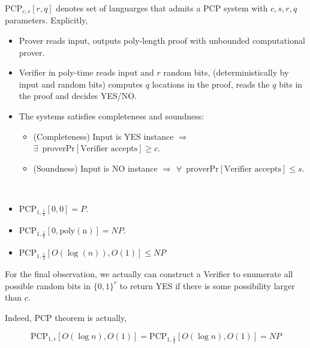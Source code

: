 
\begin{definition}
    $ \mathrm{PCP}_{c,s}[r,q] $ denotes set of languarges that admits a PCP system with  $ c,s,r,q  $ parameters. Explicitly,
    \begin{itemize}
        \item Prover reads input, outputs poly-length proof with unbounded computational prover.
        \item Verifier in poly-time reads input and  $ r $ random bits, (deterministically by input and random bits) computes  $ q $ locations in the proof, reads the  $ q $ bits in the proof and decides YES/NO.
        \item The systems satisfies  completeness and soundness:
        \begin{itemize}
            \item (Completeness) Input is YES instance  $ \Rightarrow  $  $ \exists\,\text{ prover}\mathrm{Pr}[\text{Verifier accepts}] \geq c $.
            \item (Soundness) Input is NO instance  $ \Rightarrow  $  $ \forall\,\text{ prover}\mathrm{Pr}[\text{Verifier accepts}] \leq s $. 
        \end{itemize}
    \end{itemize}
\end{definition}
\begin{observation}
    \,
    \begin{itemize}
        \item  $ \mathrm{PCP}_{1,\frac{1}{2}}[0,0]=P $.
        \item  $ \mathrm{PCP}_{1,\frac{1}{2}}[0,\mathrm{poly(n)}]=NP $.
        \item  $ \mathrm{PCP}_{1,\frac{1}{2}}[O(\log(n)),O(1)] \leq NP $   
    \end{itemize}
\end{observation}
For the final observation, we actually can construct a Verifier to enumerate all possible random bits in $ \{0,1\}^r $ to return YES if there is some possibility larger than  $ c $.

Indeed, PCP theorem is actually,
\begin{theorem}
    \[\mathrm{PCP}_{1,\epsilon}[O(\log n),O(1)]=\mathrm{PCP}_{1,\frac{1}{2}}[O(\log n),O(1)]=NP \]
\end{theorem}

